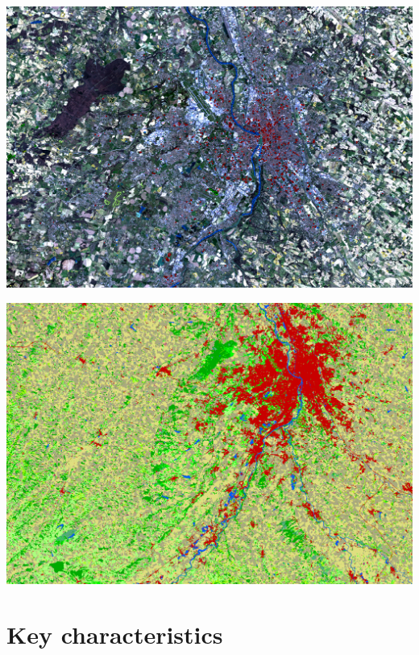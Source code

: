 \documentclass[8pt]{beamer}
\begin{document}
\vspace*{-6.5mm}
\begin{frame}[plain]
\hspace*{-11mm}
    \includegraphics[keepaspectratio,height=1.1\paperheight]{../../Courses/org/WorkshopGuide/Images/samples_selection.png}
\end{frame}


\vspace*{-6.5mm}
\begin{frame}[plain]
\hspace*{-11mm}
    \includegraphics[keepaspectratio,height=1.1\paperheight]{../../Courses/org/WorkshopGuide/Images/final_classification.png}
\end{frame}


\section{Key characteristics}
\end{document}
